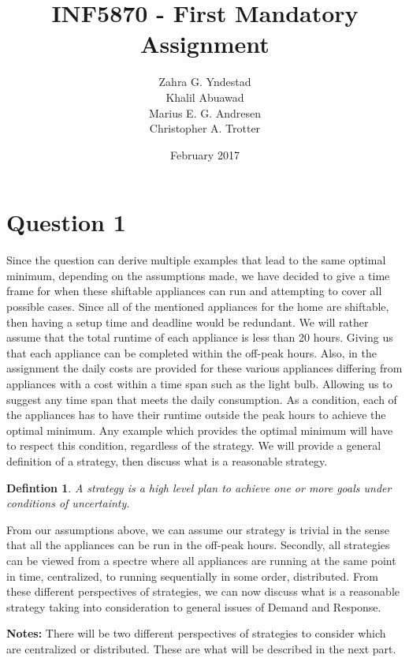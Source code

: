 \documentclass{article}
\title{INF5870 - First Mandatory Assignment}
\author{Zahra G. Yndestad \\ Khalil Abuawad \\ Marius E. G. Andresen \\ Christopher A. Trotter}
\date{February 2017}
\newtheorem{definition}[theorem]{Defintion}
\begin{document}
\maketitle

\section{Question 1}
	Since the question can derive multiple examples that lead to the same optimal minimum, depending on the assumptions made, we have decided to give a time frame for when these shiftable appliances can run and attempting to cover all possible cases. Since all of the mentioned appliances for the home are shiftable, then having a setup time and deadline would be redundant. We will rather assume that the total runtime of each appliance is less than 20 hours. Giving us that each appliance can be completed within the off-peak hours. Also, in the assignment the daily costs are provided for these various appliances differing from appliances with a cost within a time span such as the light bulb. Allowing us to suggest any time span that meets the daily consumption.  As a condition, each of the appliances has to have their runtime outside the peak hours to achieve the optimal minimum. Any example which provides the optimal minimum will have to respect this condition, regardless of the strategy. We will provide a general definition of a strategy, then discuss what is a reasonable strategy.
	
	\begin{definition}
    	A strategy is a high level plan to achieve one or more goals under conditions of uncertainty{\cite{wikistrategy}}. 
	\end{definition}
	
	From our assumptions above, we can assume our strategy is trivial in the sense that all the appliances can be run in the off-peak hours. Secondly, all strategies can be viewed from a spectre where all appliances are running at the same point in time, centralized, to running sequentially in some order, distributed. From these different perspectives of strategies, we can now discuss what is a reasonable strategy taking into consideration to general issues of Demand and Response.
    
    
    \textbf{Notes:} There will be two different perspectives of strategies to consider which are centralized or distributed. These are what will be described in the next part.

    
    
    \printbibliography[heading=bibintoc]
\end{document}
